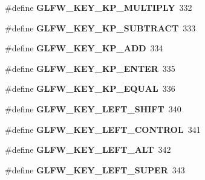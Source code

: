 \begin{DoxyCompactItemize}
\item 
\hypertarget{group__keys_ga9ada267eb0e78ed2ada8701dd24a56ef}{\#define {\bfseries \-G\-L\-F\-W\-\_\-\-K\-E\-Y\-\_\-\-K\-P\-\_\-\-M\-U\-L\-T\-I\-P\-L\-Y}~332}\label{group__keys_ga9ada267eb0e78ed2ada8701dd24a56ef}

\item 
\hypertarget{group__keys_gaa3dbd60782ff93d6082a124bce1fa236}{\#define {\bfseries \-G\-L\-F\-W\-\_\-\-K\-E\-Y\-\_\-\-K\-P\-\_\-\-S\-U\-B\-T\-R\-A\-C\-T}~333}\label{group__keys_gaa3dbd60782ff93d6082a124bce1fa236}

\item 
\hypertarget{group__keys_gad09c7c98acc79e89aa6a0a91275becac}{\#define {\bfseries \-G\-L\-F\-W\-\_\-\-K\-E\-Y\-\_\-\-K\-P\-\_\-\-A\-D\-D}~334}\label{group__keys_gad09c7c98acc79e89aa6a0a91275becac}

\item 
\hypertarget{group__keys_ga4f728f8738f2986bd63eedd3d412e8cf}{\#define {\bfseries \-G\-L\-F\-W\-\_\-\-K\-E\-Y\-\_\-\-K\-P\-\_\-\-E\-N\-T\-E\-R}~335}\label{group__keys_ga4f728f8738f2986bd63eedd3d412e8cf}

\item 
\hypertarget{group__keys_gaebdc76d4a808191e6d21b7e4ad2acd97}{\#define {\bfseries \-G\-L\-F\-W\-\_\-\-K\-E\-Y\-\_\-\-K\-P\-\_\-\-E\-Q\-U\-A\-L}~336}\label{group__keys_gaebdc76d4a808191e6d21b7e4ad2acd97}

\item 
\hypertarget{group__keys_ga8a530a28a65c44ab5d00b759b756d3f6}{\#define {\bfseries \-G\-L\-F\-W\-\_\-\-K\-E\-Y\-\_\-\-L\-E\-F\-T\-\_\-\-S\-H\-I\-F\-T}~340}\label{group__keys_ga8a530a28a65c44ab5d00b759b756d3f6}

\item 
\hypertarget{group__keys_ga9f97b743e81460ac4b2deddecd10a464}{\#define {\bfseries \-G\-L\-F\-W\-\_\-\-K\-E\-Y\-\_\-\-L\-E\-F\-T\-\_\-\-C\-O\-N\-T\-R\-O\-L}~341}\label{group__keys_ga9f97b743e81460ac4b2deddecd10a464}

\item 
\hypertarget{group__keys_ga7f27dabf63a7789daa31e1c96790219b}{\#define {\bfseries \-G\-L\-F\-W\-\_\-\-K\-E\-Y\-\_\-\-L\-E\-F\-T\-\_\-\-A\-L\-T}~342}\label{group__keys_ga7f27dabf63a7789daa31e1c96790219b}

\item 
\hypertarget{group__keys_gafb1207c91997fc295afd1835fbc5641a}{\#define {\bfseries \-G\-L\-F\-W\-\_\-\-K\-E\-Y\-\_\-\-L\-E\-F\-T\-\_\-\-S\-U\-P\-E\-R}~343}\label{group__keys_gafb1207c91997fc295afd1835fbc5641a}


\end{DoxyCompactItemize}
